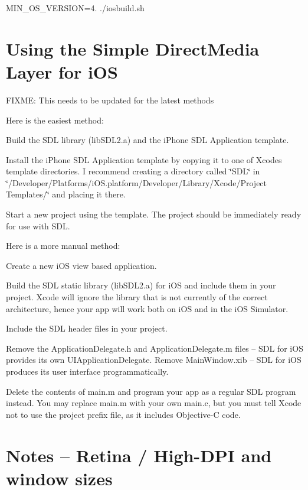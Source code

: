 M\+I\+N\+\_\+\+O\+S\+\_\+\+V\+E\+R\+S\+I\+ON=4. ./iosbuild.sh 

 \section*{Using the Simple Direct\+Media Layer for i\+OS }

F\+I\+X\+ME\+: This needs to be updated for the latest methods

Here is the easiest method\+:
\begin{DoxyEnumerate}
\item Build the S\+DL library (lib\+S\+D\+L2.\+a) and the i\+Phone S\+DL Application template.
\item Install the i\+Phone S\+DL Application template by copying it to one of Xcode\textquotesingle{}s template directories. I recommend creating a directory called \char`\"{}\+S\+D\+L\char`\"{} in \char`\"{}/\+Developer/\+Platforms/i\+O\+S.\+platform/\+Developer/\+Library/\+Xcode/\+Project Templates/\char`\"{} and placing it there.
\item Start a new project using the template. The project should be immediately ready for use with S\+DL.
\end{DoxyEnumerate}

Here is a more manual method\+:
\begin{DoxyEnumerate}
\item Create a new i\+OS view based application.
\item Build the S\+DL static library (lib\+S\+D\+L2.\+a) for i\+OS and include them in your project. Xcode will ignore the library that is not currently of the correct architecture, hence your app will work both on i\+OS and in the i\+OS Simulator.
\item Include the S\+DL header files in your project.
\item Remove the Application\+Delegate.\+h and Application\+Delegate.\+m files -- S\+DL for i\+OS provides its own U\+I\+Application\+Delegate. Remove Main\+Window.\+xib -- S\+DL for i\+OS produces its user interface programmatically.
\item Delete the contents of main.\+m and program your app as a regular S\+DL program instead. You may replace main.\+m with your own main.\+c, but you must tell Xcode not to use the project prefix file, as it includes Objective-\/C code. 

 \section*{Notes -- Retina / High-\/\+D\+PI and window sizes }
\end{DoxyEnumerate}

